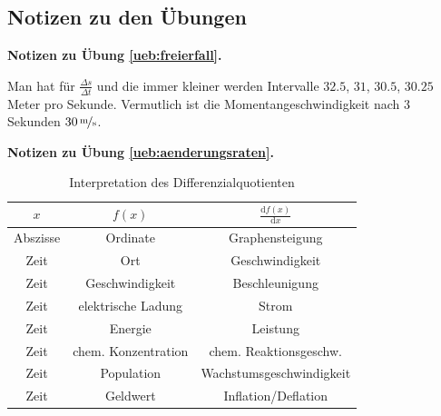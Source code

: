 \documentclass[%
11pt,%
twoside,%
titlepage,%
german,%
headsepline%
]{scrartcl}
\newcommand{\spaltenheight}{\rule{0mm}{3ex}}
\newcommand{\spaltensep}{\\[1ex]}
\theoremstyle{definition}
\theoremstyle{plain}
\newcommand{\concatueb}[1]{ueb:#1}%
\newcommand{\concatlsg}[1]{lsg:#1}%
\newenvironment{lsg}[1]{%
    \par\noindent\textbf{Notizen zu Übung \ref{\concatueb{#1}}.}%
    \label{\concatlsg{#1}}
}{%
    \par%
}
\begin{document}
\clearpage

\subsection{Notizen zu den Übungen}

\begin{lsg}{freierfall}
    Man hat für $\frac{\Delta s}{\Delta t}$ und die immer kleiner werden Intervalle $32.5$, $31$, $30.5$, $30.25$ Meter pro Sekunde. Vermutlich ist die Momentangeschwindigkeit nach 3 Sekunden $\unitfrac[30]{m}{s}$.
\end{lsg}
\begin{lsg}{aenderungsraten}
    \begin{table}[h]
\normalsize
\begin{center}
\begin{tabular}{|c|c|c|}
\hline
\rowcolor{Gray}\spaltenheight $x$ & $f(x)$ & $\frac{\mathrm{d}f(x)}{\mathrm{d}x}$ \spaltensep\hline
\rowcolor{lightyellow}\spaltenheight Abszisse & Ordinate & Graphensteigung \spaltensep\hline
\rowcolor{Gray}\spaltenheight Zeit & Ort & Geschwindigkeit\spaltensep\hline
\rowcolor{lightyellow}\spaltenheight Zeit & Geschwindigkeit & Beschleunigung \spaltensep\hline
\rowcolor{Gray}\spaltenheight Zeit & elektrische Ladung & Strom\spaltensep\hline
\rowcolor{lightyellow}\spaltenheight Zeit & Energie & Leistung \spaltensep\hline
\rowcolor{Gray}\spaltenheight Zeit & chem. Konzentration & chem. Reaktionsgeschw.\spaltensep\hline
\rowcolor{lightyellow}\spaltenheight  Zeit & Population & Wachstumsgeschwindigkeit \spaltensep\hline
\rowcolor{Gray}\spaltenheight  Zeit & Geldwert & Inflation/Deflation\spaltensep\hline
\end{tabular}
\end{center}
\caption{Interpretation des Differenzialquotienten}\label{tab:interpretation}
\end{table}
\end{lsg}
\end{document}
